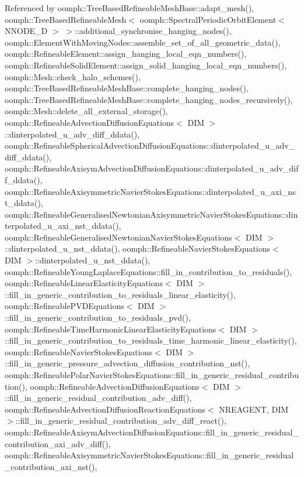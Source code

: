 Referenced by oomph\+::\+Tree\+Based\+Refineable\+Mesh\+Base\+::adapt\+\_\+mesh(), oomph\+::\+Tree\+Based\+Refineable\+Mesh$<$ oomph\+::\+Spectral\+Periodic\+Orbit\+Element$<$ N\+N\+O\+D\+E\+\_\+D $>$ $>$\+::additional\+\_\+synchronise\+\_\+hanging\+\_\+nodes(), oomph\+::\+Element\+With\+Moving\+Nodes\+::assemble\+\_\+set\+\_\+of\+\_\+all\+\_\+geometric\+\_\+data(), oomph\+::\+Refineable\+Element\+::assign\+\_\+hanging\+\_\+local\+\_\+eqn\+\_\+numbers(), oomph\+::\+Refineable\+Solid\+Element\+::assign\+\_\+solid\+\_\+hanging\+\_\+local\+\_\+eqn\+\_\+numbers(), oomph\+::\+Mesh\+::check\+\_\+halo\+\_\+schemes(), oomph\+::\+Tree\+Based\+Refineable\+Mesh\+Base\+::complete\+\_\+hanging\+\_\+nodes(), oomph\+::\+Tree\+Based\+Refineable\+Mesh\+Base\+::complete\+\_\+hanging\+\_\+nodes\+\_\+recursively(), oomph\+::\+Mesh\+::delete\+\_\+all\+\_\+external\+\_\+storage(), oomph\+::\+Refineable\+Advection\+Diffusion\+Equations$<$ D\+I\+M $>$\+::dinterpolated\+\_\+u\+\_\+adv\+\_\+diff\+\_\+ddata(), oomph\+::\+Refineable\+Spherical\+Advection\+Diffusion\+Equations\+::dinterpolated\+\_\+u\+\_\+adv\+\_\+diff\+\_\+ddata(), oomph\+::\+Refineable\+Axisym\+Advection\+Diffusion\+Equations\+::dinterpolated\+\_\+u\+\_\+adv\+\_\+diff\+\_\+ddata(), oomph\+::\+Refineable\+Axisymmetric\+Navier\+Stokes\+Equations\+::dinterpolated\+\_\+u\+\_\+axi\+\_\+nst\+\_\+ddata(), oomph\+::\+Refineable\+Generalised\+Newtonian\+Axisymmetric\+Navier\+Stokes\+Equations\+::dinterpolated\+\_\+u\+\_\+axi\+\_\+nst\+\_\+ddata(), oomph\+::\+Refineable\+Generalised\+Newtonian\+Navier\+Stokes\+Equations$<$ D\+I\+M $>$\+::dinterpolated\+\_\+u\+\_\+nst\+\_\+ddata(), oomph\+::\+Refineable\+Navier\+Stokes\+Equations$<$ D\+I\+M $>$\+::dinterpolated\+\_\+u\+\_\+nst\+\_\+ddata(), oomph\+::\+Refineable\+Young\+Laplace\+Equations\+::fill\+\_\+in\+\_\+contribution\+\_\+to\+\_\+residuals(), oomph\+::\+Refineable\+Linear\+Elasticity\+Equations$<$ D\+I\+M $>$\+::fill\+\_\+in\+\_\+generic\+\_\+contribution\+\_\+to\+\_\+residuals\+\_\+linear\+\_\+elasticity(), oomph\+::\+Refineable\+P\+V\+D\+Equations$<$ D\+I\+M $>$\+::fill\+\_\+in\+\_\+generic\+\_\+contribution\+\_\+to\+\_\+residuals\+\_\+pvd(), oomph\+::\+Refineable\+Time\+Harmonic\+Linear\+Elasticity\+Equations$<$ D\+I\+M $>$\+::fill\+\_\+in\+\_\+generic\+\_\+contribution\+\_\+to\+\_\+residuals\+\_\+time\+\_\+harmonic\+\_\+linear\+\_\+elasticity(), oomph\+::\+Refineable\+Navier\+Stokes\+Equations$<$ D\+I\+M $>$\+::fill\+\_\+in\+\_\+generic\+\_\+pressure\+\_\+advection\+\_\+diffusion\+\_\+contribution\+\_\+nst(), oomph\+::\+Refineable\+Polar\+Navier\+Stokes\+Equations\+::fill\+\_\+in\+\_\+generic\+\_\+residual\+\_\+contribution(), oomph\+::\+Refineable\+Advection\+Diffusion\+Equations$<$ D\+I\+M $>$\+::fill\+\_\+in\+\_\+generic\+\_\+residual\+\_\+contribution\+\_\+adv\+\_\+diff(), oomph\+::\+Refineable\+Advection\+Diffusion\+Reaction\+Equations$<$ N\+R\+E\+A\+G\+E\+N\+T, D\+I\+M $>$\+::fill\+\_\+in\+\_\+generic\+\_\+residual\+\_\+contribution\+\_\+adv\+\_\+diff\+\_\+react(), oomph\+::\+Refineable\+Axisym\+Advection\+Diffusion\+Equations\+::fill\+\_\+in\+\_\+generic\+\_\+residual\+\_\+contribution\+\_\+axi\+\_\+adv\+\_\+diff(), oomph\+::\+Refineable\+Axisymmetric\+Navier\+Stokes\+Equations\+::fill\+\_\+in\+\_\+generic\+\_\+residual\+\_\+contribution\+\_\+axi\+\_\+nst(), 